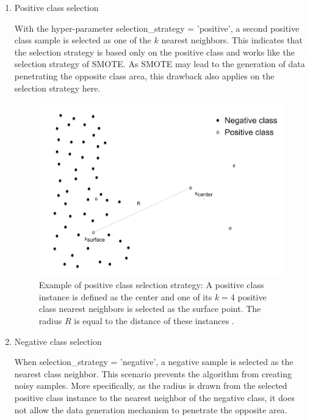 \documentclass[parskip=full]{scrartcl}
\begin{document}
\begin{enumerate}[label=($\alph*$)]

\item Positive class selection

With the hyper-parameter selection\_strategy = 'positive', a second positive 
class sample is selected as one of the $\mathit{k}$ nearest neighbors. This 
indicates that the selection strategy is based only on the positive class and 
works like the selection strategy of SMOTE. As SMOTE may lead to the generation 
of data penetrating the opposite class area, this drawback also applies on the 
selection strategy here.

\begin{figure}[H]
	\centering
	\includegraphics[width=0.51\linewidth]
		{./resources/positive_class_selection_strategy}
	\caption{Example of positive class selection strategy: A positive class 
	instance is defined as the center and one of its $\mathit{k = 4}$ positive 
	class nearest neighbors is selected as the surface point. The radius 
	$\mathit{R}$ is equal to the distance of these instances 
	\cite{Douzas.2019b}.}
	\label{fig:positiveclassselectionstrategy}
\end{figure}

\item Negative class selection

When selection\_strategy = 'negative', a negative sample is selected as the 
nearest class neighbor. This scenario prevents the algorithm from creating 
noisy samples. More specifically, as the radius is drawn from the selected 
positive class instance to the nearest neighbor of the negative class, it does 
not allow the data generation mechanism to penetrate the opposite area.


\end{enumerate}
\end{document}
